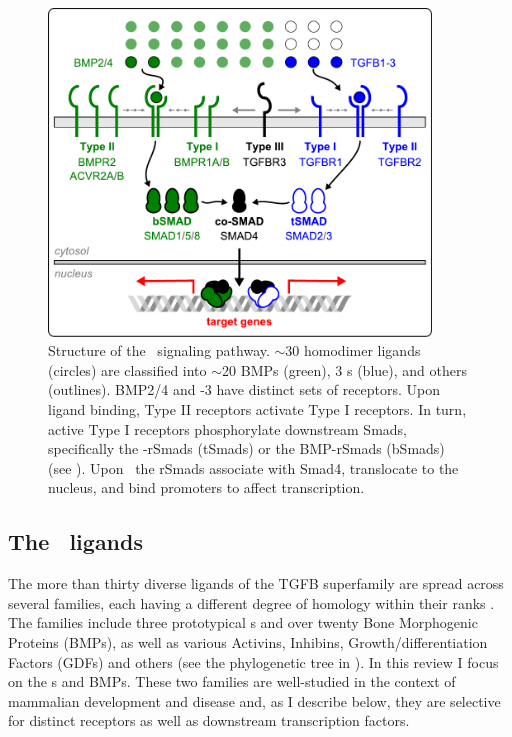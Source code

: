   \begin{figure}[!bt]
  \centering
  \includegraphics[width=4in]{FIGS/pathways/tgfb.pdf}
  {\singlespacing 
  \caption[Structure of the \tgfbsf\ signaling pathway]
        { Structure of the \tgfbsf\ signaling pathway.
          $\sim$30 homodimer ligands (circles) are classified into
          $\sim$20 BMPs (green), 3 \tgf s (blue), and others (outlines).
          BMP2/4 and -3 have distinct sets of receptors. Upon ligand
          binding, Type II receptors activate Type I receptors. In turn, active
          Type I receptors phosphorylate downstream Smads, specifically the \tgf-rSmads
		  (tSmads) or the BMP-rSmads (bSmads) (see ).
		  Upon \pn\ the rSmads associate with Smad4,
          translocate to the nucleus, and bind promoters to affect transcription.
  }
  \label{fig:pathways:tgfb}}
  \end{figure}




\subsection{The \tgfbsf\ ligands}
\label{pathways:tgfb:ligands}

The more than thirty diverse ligands of the TGFB
superfamily are spread across several families,
each having a different degree of homology within their ranks
\cite{Massague2005,Ehrlich2011,Wakefield2013}. The families
include three prototypical \tgf s and
over twenty Bone Morphogenic Proteins (BMPs), as well as various Activins, Inhibins,
Growth/differentiation Factors (GDFs) and others
\cite{Massague1990,Miyazono2005,Schmierer2007}
(see the phylogenetic tree in ).
In this review I focus on the \tgf s and BMPs. These two families are
well-studied in the context of mammalian development and
disease and, as I describe below, they are selective for distinct receptors as well as
downstream transcription factors.


